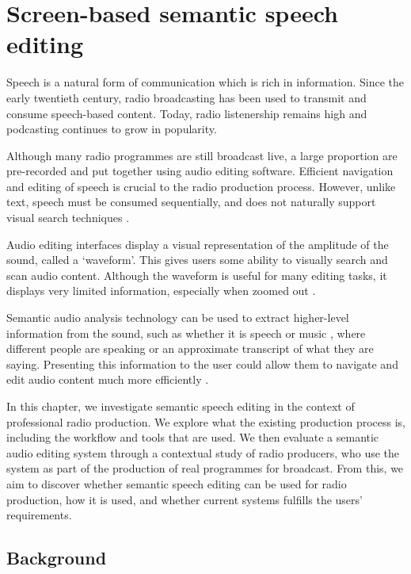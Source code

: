 \chapter{Screen-based semantic speech editing}\label{chp:screen}

Speech is a natural form of communication which is rich in information. Since
the early twentieth century, radio broadcasting has been used to transmit and
consume speech-based content. Today, radio listenership remains high and
podcasting continues to grow in popularity. 

Although many radio programmes are still broadcast live, a large proportion are
pre-recorded and put together using audio editing software. Efficient
navigation and editing of speech is crucial to the radio production process.
However, unlike text, speech must be consumed sequentially, and does not
naturally support visual search techniques \citep{Wolfe2004}. 

Audio editing interfaces display a visual representation of the amplitude of
the sound, called a `waveform'. This gives users some ability to visually
search and scan audio content. Although the waveform is useful for many editing
tasks, it displays very limited information, especially when zoomed out
\citep{Loviscach2011}.

Semantic audio analysis technology can be used to extract higher-level
information from the sound, such as whether it is speech or music
\citep{Panagiotakis2005}, where different people are speaking
\citep{AngueraMiro2012} or an approximate transcript of what they are saying.
Presenting this information to the user could allow them to navigate and edit
audio content much more efficiently \citep{Whittaker2004}.

In this chapter, we investigate semantic speech editing in the context of professional radio production. We explore what
the existing production process is, including the workflow and tools that are used.  We then evaluate a semantic audio
editing system through a contextual study of radio producers, who use the system as part of the production of real
programmes for broadcast. From this, we aim to discover whether semantic speech editing can be used for radio
production, how it is used, and whether current systems fulfills the users' requirements.


\section{Background}\label{sec:relatedwork}

